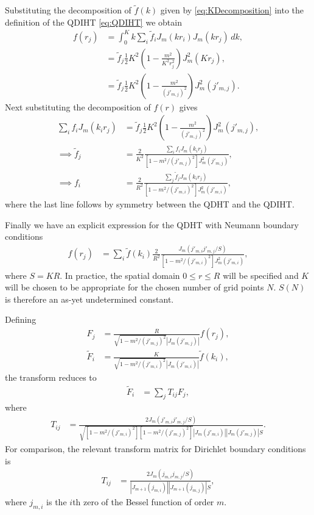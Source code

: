 \documentclass[aip,amsmath,amssymb,reprint,twocolumn]{revtex4-1}
\newcommand{\abs}[1]{\left|#1\right|}
\begin{document}
Substituting the decomposition of $\tilde{f}(k)$ given by \eqref{eq:KDecomposition} into the definition of the QDIHT \eqref{eq:QDIHT} we obtain
\begin{align}
  f(r_j) &= \int_0^K k \sum_i \tilde{f}_i J_m(k r_i) J_m(k r_j)\, dk, \\
  &= \tilde{f}_j \frac{1}{2}K^2  \left(1 - \frac{m^2}{K^2 r_j^2}\right) J_m^2(K r_j), \\
  &= \tilde{f}_j \frac{1}{2}K^2  \left(1 - \frac{m^2}{(j'_{m,j})^2}\right) J_m^2(j'_{m,j}).
\end{align}
Next substituting the decomposition of $f(r)$ gives
\begin{align}
  \sum_i f_i J_m(k_i r_j) &= \tilde{f}_j \frac{1}{2} K^2 \left(1 - \frac{m^2}{(j'_{m,j})^2}\right) J_m^2(j'_{m,j}), \\
  \implies \tilde{f}_j &= \frac{2}{K^2} \frac{\sum_i f_i J_m(k_i r_j)}{\left[1-m^2/(j'_{m,j})^2\right] J_m^2(j'_{m,j})} , \\
  \implies f_i &= \frac{2}{R^2} \frac{\sum_j \tilde{f}_j J_m(k_i r_j)}{\left[1-m^2/(j'_{m,i})^2\right] J_m^2(j'_{m,i})} ,
\end{align}
where the last line follows by symmetry between the QDHT and the QDIHT.

Finally we have an explicit expression for the QDHT with Neumann boundary conditions
\begin{align}
  f(r_j) &= \sum_i \tilde{f}(k_i) \frac{2}{R^2} \frac{J_m\left(j'_{m,i} j'_{m,j}/S\right)}{\left[1-m^2/(j'_{m,i})^2\right]J_m^2(j'_{m,i})},
\end{align}
where $S = K R$.  In practice, the spatial domain $0 \leq r \leq R$ will be specified and $K$ will be chosen to be appropriate for the chosen number of grid points $N$.  $S(N)$ is therefore an as-yet undetermined constant.

\begin{widetext}
Defining
\begin{align}
    F_j &= \frac{R}{\sqrt{1-m^2/(j'_{m,j})^2} \abs{J_m(j'_{m,j})}} f(r_j), \\
    \tilde{F}_i &= \frac{K}{\sqrt{1-m^2/(j'_{m,i})^2} \abs{J_m(j'_{m,i})}}  \tilde{f}(k_i),
\end{align}
the transform reduces to
\begin{align}
    \tilde{F}_i &= \sum_j T_{ij} F_j,
\end{align}
where
\begin{align}
    T_{ij} &= \frac{2 J_m(j'_{m,i} j'_{m,j}/S)}{\sqrt{\left[1-m^2/(j'_{m,i})^2\right]\left[1-m^2/(j'_{m,j})^2\right]} \abs{J_m(j'_{m,i})} \abs{J_m(j'_{m,j})} S}.
\end{align}
For comparison, the relevant transform matrix for Dirichlet boundary conditions is\citep{Guizar-Sicairos:2004}
\begin{align}
  T_{ij} &= \frac{2 J_m(j_{m,i} j_{m,j}/S)}{\abs{J_{m+1}(j_{m,i})} \abs{J_{m+1}(j_{m,j})} S},
\end{align}
where $j_{m,i}$ is the $i$th zero of the Bessel function of order $m$.
\end{widetext}
\end{document}
